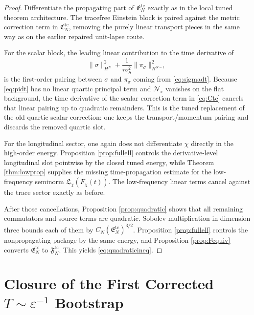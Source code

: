 \documentclass[11pt]{article}
\begin{document}
\begin{proof}
Differentiate the propagating part of \(\mathfrak E_N^{\mathrm{tc}}\) exactly as in the local tuned theorem architecture. The tracefree Einstein block is paired against the metric correction term in \(\mathfrak C_N^{\mathrm{tc}}\), removing the purely linear transport pieces in the same way as on the earlier repaired unit-lapse route.

For the scalar block, the leading linear contribution to the time derivative of
\[
\|\sigma\|_{H^N}^2+\frac{1}{m_S^2}\|\pi_\sigma\|_{H^{N-1}}^2
\]
is the first-order pairing between \(\sigma\) and \(\pi_\sigma\) coming from \eqref{eq:sigmadt}. Because \eqref{eq:pidt} has no linear quartic principal term and \(\mathcal N_\pi\) vanishes on the flat background, the time derivative of the scalar correction term in \eqref{eq:Ctc} cancels that linear pairing up to quadratic remainders. This is the tuned replacement of the old quartic scalar correction: one keeps the transport/momentum pairing and discards the removed quartic slot.

For the longitudinal sector, one again does not differentiate \(\chi\) directly in the high-order energy. Proposition \ref{prop:fullell} controls the derivative-level longitudinal slot pointwise by the closed tuned energy, while Theorem \ref{thm:lowprop} supplies the missing time-propagation estimate for the low-frequency seminorm \(\mathfrak L_\chi(F_\chi(t))\). The low-frequency linear terms cancel against the trace sector exactly as before.

After those cancellations, Proposition \ref{prop:quadratic} shows that all remaining commutators and source terms are quadratic. Sobolev multiplication in dimension three bounds each of them by \(C_N(\mathfrak E_N^{\mathrm{tc}})^{3/2}\). Proposition \ref{prop:fullell} controls the nonpropagating package by the same energy, and Proposition \ref{prop:Fequiv} converts \(\mathfrak E_N^{\mathrm{tc}}\) to \(\mathfrak F_N^{\mathrm{tc}}\). This yields \eqref{eq:quadraticineq}.
\end{proof}

\section{Closure of the First Corrected \texorpdfstring{\(T\sim\varepsilon^{-1}\)}{T~eps^-1} Bootstrap}
\end{document}
